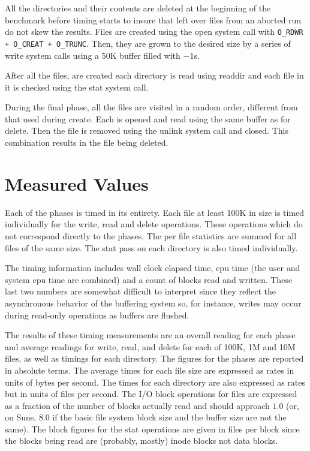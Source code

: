 All the directories and their contents are deleted at the beginning of
the benchmark before timing starts to insure that left over files from an
aborted run do not skew the results.  Files are created using the open
system call with {\tt O_RDWR + O_CREAT + O_TRUNC}.  Then, they are grown
to the desired size by a series of write system calls using a 50K buffer
filled with $-1$s.

After all the files, are created each directory is read using readdir and
each file in it is checked using the stat system call.

During the final phase, all the files are visited in a random order,
different from that used during create.  Each is opened and read using
the same buffer as for delete.  Then the file is removed using the
unlink system call and closed.  This combination results in the file
being deleted.

\section{Measured Values}

Each of the phases is timed in its entirety.  Each file at least 100K in
size is timed individually for the write, read and delete operations.
These operations which do not correspond directly to the phases.  The
per file statistics are summed for all files of the same size.  The stat
pass on each directory is also timed individually.

The timing information includes wall clock elapsed time, cpu time (the
user and system cpu time are combined) and a count of blocks read and
written.  These last two numbers are somewhat difficult to interpret
since they reflect the asynchronous behavior of the buffering system so,
for instance, writes may occur during read-only operations as buffers
are flushed.

The results of these timing measurements are an overall reading for each
phase and average readings for write, read, and delete for each of 100K,
1M and 10M files, as well as timings for each directory.  The figures
for the phases are reported in absolute terms.  The average times for
each file size are expressed as rates in units of bytes per second.  The
times for each directory are also expressed as rates but in units of
files per second.  The I/O block operations for files are expressed as a
fraction of the number of blocks actually read and should approach $1.0$
(or, on Suns, $8.0$ if the basic file system block size and the buffer
size are not the same).  The block figures for the stat operations are
given in files per block since the blocks being read are (probably,
mostly) inode blocks not data blocks.


